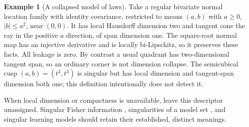 \documentclass[11pt]{article}
\theoremstyle{definition}
\newtheorem{example}{Example}
\theoremstyle{remark}
\begin{document}
\begin{example}[A collapsed model of laws]
Take a regular bivariate normal location family with identity covariance,
restricted to means $(a,b)$ with $a\ge0$, $|b|\le a^2$, near $(0,0)$.
It has local Hausdorff dimension two and tangent cone the ray in the positive
$a$ direction, of span dimension one. The square-root normal map has an
injective derivative and is locally bi-Lipschitz, so it preserves these facts.
All leakage is zero. By contrast a usual quadrant has two-dimensional tangent
span, so an ordinary corner is not dimension collapse. The semicubical cusp
$(a,b)=(t^2,t^3)$ is singular but has local dimension and tangent-span dimension
both one; this definition intentionally does not detect it.
\end{example}
When local dimension or compactness is unavailable, leave this descriptor
unassigned. Singular Fisher information \cite{rcbr}, singularities of a model
set \cite{drton}, and singular learning models \cite{watanabe} should retain
their established, distinct meanings.
\end{document}
